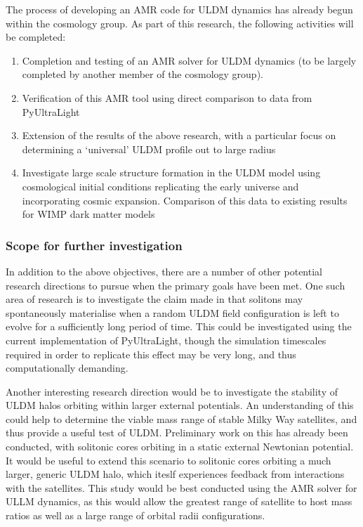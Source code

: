 The process of developing an AMR code for ULDM dynamics has already begun within the cosmology group. As part of this research, the following activities will be completed:

\begin{enumerate}
    \item Completion and testing of an AMR solver for ULDM dynamics (to be largely completed by another member of the cosmology group).
    \item Verification of this AMR tool using direct comparison to data from PyUltraLight
    \item Extension of the results of the above research, with a particular focus on determining a `universal' ULDM profile out to large radius
    \item Investigate large scale structure formation in the ULDM model using cosmological initial conditions replicating the early universe and incorporating cosmic expansion. Comparison of this data to existing results for WIMP dark matter models
\end{enumerate}


\subsubsection{Scope for further investigation}\label{additional}

In addition to the above objectives, there are a number of other potential research directions to pursue when the primary goals have been met. One such area of research is to investigate the claim made in \cite{Levkov:2018kau} that solitons may spontaneously materialise when a random ULDM field configuration is left to evolve for a sufficiently long period of time. This could be investigated using the current implementation of PyUltraLight, though the simulation timescales required in order to replicate this effect may be very long, and thus computationally demanding. 

Another interesting research direction would be to investigate the stability of ULDM halos orbiting within larger external potentials. An understanding of this could help to determine the viable mass range of stable Milky Way satellites, and thus provide a useful test of ULDM. Preliminary work on this has already been conducted, with solitonic cores orbiting in a static external Newtonian potential. It would be useful to extend this scenario to solitonic cores orbiting a much larger, generic ULDM halo, which iteslf experiences feedback from interactions with the satellites. This study would be best conducted using the AMR solver for ULLM dynamics, as this would allow the greatest range of satellite to host mass ratios as well as a large range of orbital radii configurations. 


